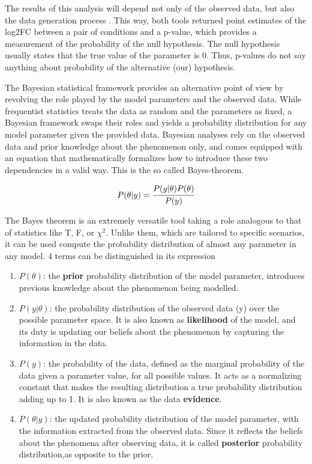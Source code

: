 \documentclass[11pt, a4paper]{report}
\begin{document}
The results of this analysis will depend not only of the observed data, but also the data generation process \cite{Kruschke}. This way, both tools returned point estimates of the log2FC between a pair of conditions and a p-value, which provides a measurement of the probability of the null hypothesis. The null hypothesis usually states that the true value of the parameter is 0. Thus, p-values do not say anything about probability of the alternative (our) hypothesis.

The Bayesian statistical framework provides an alternative point of view by revolving the role played by the model parameters and the observed data. While frequentist statistics treats the data as random and the parameters as fixed, a Bayesian framework swaps their roles and yields a probability distribution for any model parameter given the provided data. Bayesian analyses rely on the observed data and prior knowledge about the phenomenon only, and comes equipped with an equation that mathematically formalizes how to introduce these two dependencies in a valid way. This is the so called Bayes-theorem.

\begin{equation}
P(\theta | y) = \cfrac{P(y | \theta) P(\theta)}{P(y)}
\end{equation}

The Bayes theorem is an extremely versatile tool taking a role analogous to that of statistics like T, F, or $\chi^2$. Unlike them, which are tailored to specific scenarios, it can be used compute the probability distribution of almost any parameter in any model. 4 terms can be distinguished in its expression

\begin{enumerate}

\item $P(\theta)$: the \textbf{prior} probability distribution of the model parameter, introduces previous knowledge about the phenomenon being modelled.

\item $P(y | \theta)$: the probability distribution of the observed data (y) over the possible parameter space. It is also known as \textbf{likelihood} of the model, and its duty is updating our beliefs about the phenomenon by capturing the information in the data.

\item $P(y)$: the probability of the data, defined as the marginal probability of the data given a parameter value, for all possible values. It acts as a normalizing constant that makes the resulting distribution a true probability distribution adding up to 1. It is also known as the data \textbf{evidence}.

\item $P(\theta | y)$: the updated probability distribution of the model parameter, with the information extracted from the observed data. Since it reflects the beliefs about the phenomena after observing data, it is called \textbf{posterior} probability distribution,as opposite to the prior.

\end{enumerate}
\end{document}

